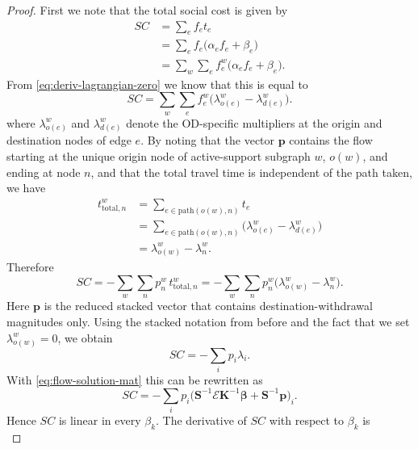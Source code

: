 \documentclass[twocolumn,english,groupedaddress, superscriptaddress,aps,pre,10pt,floatfix]{revtex4-2}
\newcommand{\matr}[1]{{\boldsymbol{#1}}}
\renewcommand{\vec}[1]{{\boldsymbol{#1}}}
\begin{document}
\begin{proof}
First we note that the total social cost is given by
\begin{align}
    SC &= \sum_{e} f_e t_e\\
       &= \sum_{e} f_e\bigl(\alpha_e f_e+\beta_e\bigr)\\
       &= \sum_{w}\sum_{e} f_e^{w}\bigl(\alpha_e f_e+\beta_e\bigr).
\end{align}
From \cref{eq:deriv-lagrangian-zero} we know that this is equal to
\begin{equation}
    SC = \sum_{w}\sum_{e} f_e^{w}\bigl(\lambda^w_{o(e)}-\lambda^w_{d(e)}\bigr).
\end{equation}
where $\lambda^w_{o(e)}$ and $\lambda^w_{d(e)}$ denote the OD-specific multipliers at the origin and destination nodes of edge $e$.
By noting that the vector $\vec{p}$ contains the flow starting at the unique origin node of active-support subgraph $w$, $o(w)$, and ending at node $n$, and that the total travel time is independent of the path taken, we have
\begin{equation}
\begin{split}
t^{w}_{\text{total},n}
    &= \sum_{e\in\text{path}(o(w),n)} t_e\\
    &= \sum_{e\in\text{path}(o(w),n)}\bigl(\lambda^{w}_{o(e)}-\lambda^{w}_{d(e)}\bigr)\\
    &= \lambda^{w}_{o(w)}-\lambda^{w}_{n}.
\end{split}
\end{equation}
Therefore
\begin{equation}
    SC = -\sum_{w}\sum_{n} p^{w}_{n}\,t^{w}_{\text{total},n}
        = -\sum_{w}\sum_{n}p^{w}_{n}\bigl(\lambda^{w}_{o(w)}-\lambda^{w}_{n}\bigr).
\end{equation}
Here $\vec{p}$ is the reduced stacked vector that contains destination-withdrawal magnitudes only. Using the stacked notation from before and the fact that we set $\lambda^{w}_{o(w)}=0$, we obtain
\begin{equation}
    SC = -\sum_{i} p_{i}\lambda_{i}.
\end{equation}
With \cref{eq:flow-solution-mat} this can be rewritten as
\begin{equation}
    SC = -\sum_{i} p_{i}\bigl(\matr{S}^{-1}\matr{\mathcal{E}}\matr{K}^{-1}\boldsymbol{\beta}
                     + \matr{S}^{-1}\vec{p}\bigr)_{i}.
\end{equation}
Hence $SC$ is linear in every $\beta_{k}$. The derivative of $SC$ with respect to $\beta_{k}$ is
\begin{equation}\label{eq:cost-gradient}

\end{equation}
\end{proof}
\end{document}
